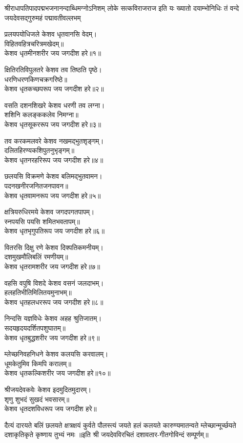 
\bigskip
{}
\bigskip
{}
{श्रीराधापतिपादपद्मभजनानन्दाब्धिमग्नोऽनिशम्}
{लोके सत्कविराजराज इति यः ख्यातो दयाम्भोनिधिः}
{तं वन्दे जयदेवसद्गुरुमहं पद्मावतीवल्लभम्}

प्रलयपयोधिजले केशव धृतवानसि वेदम्।\\
विहितवहित्रचरित्रमखेदम्॥\\
केशव धृतमीनशरीर जय जगदीश हरे॥१॥

\smallskip
क्षितिरतिविपुलतरे केशव तव तिष्ठति पृष्ठे।\\
धरणिधरणकिणचक्रगरिष्ठे॥\\
केशव धृतकच्छपरूप जय जगदीश हरे॥२॥

\smallskip
वसति दशनशिखरे केशव धरणी तव लग्ना।\\
शशिनि कलङ्ककलेव निमग्ना॥\\
केशव धृतसूकररूप जय जगदीश हरे॥३॥

\smallskip
तव करकमलवरे केशव नखमद्भुतशृङ्गम्।\\
दलितहिरण्यकशिपुतनुभृङ्गम्॥\\
केशव धृतनरहरिरूप जय जगदीश हरे॥४॥

\smallskip
छलयसि विक्रमणे केशव बलिमद्भुतवामन।\\
पदनखनीरजनितजनपावन॥\\
केशव धृतवामनरूप जय जगदीश हरे॥५॥

\smallskip
क्षत्रियरुधिरमये केशव जगदपगतपापम्।\\
स्नपयसि पयसि शमितभवतापम्॥\\
केशव धृतभृगुपतिरूप जय जगदीश हरे॥६॥

\smallskip
वितरसि दिक्षु रणे केशव दिक्पतिकमनीयम्।\\
दशमुखमौलिबलिं रमणीयम्॥\\
केशव धृतरामशरीर जय जगदीश हरे॥७॥

\smallskip
वहसि वपुषि विशदे केशव वसनं जलदाभम्।\\
हलहतिभीतिमिलितयमुनाभम्॥\\
केशव धृतहलधररूप जय जगदीश हरे॥८॥

\smallskip
निन्दसि यज्ञविधेः केशव अहह श्रुतिजातम्।\\
सदयहृदयदर्शितपशुघातम्॥\\
केशव धृतबुद्धशरीर जय जगदीश हरे॥९॥

\smallskip
म्लेच्छनिवहनिधने केशव कलयसि करवालम्।\\
धूमकेतुमिव किमपि करालम्॥\\
केशव धृतकल्किशरीर जय जगदीश हरे॥१०॥

\smallskip
श्रीजयदेवकवेः केशव इदमुदितमुदारम्।\\
शृणु शुभदं सुखदं भवसारम्॥\\
केशव धृतदशविधरूप जय जगदीश हरे॥

\smallskip
{}
{दैत्यं दारयते बलिं छलयते क्षत्रक्षयं कुर्वते}
{पौलस्त्यं जयते हलं कलयते कारुण्यमातन्वते}
{म्लेच्छान्मूर्च्छयते दशाकृतिकृते कृष्णाय तुभ्यं नमः}
॥इति श्री जयदेवविरचितं दशावतार-गीतगोविन्दं सम्पूर्णम्॥

